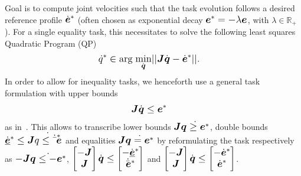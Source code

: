 Goal is to compute joint velocities such that the task evolution follows a desired reference profile
$\dot{\mbm{e}}^*$ (often chosen as exponential decay $\mbm{e}^*= -\lambda \mbm{e}$, with $\lambda
\in \mathbb{R}_+$). For a single equality task, this necessitates to solve the following least
squares Quadratic Program (QP)
%
\begin{align}\label{eq:QP}
  \dot{q}^* &\in \mbox{arg} \; \underset{\footnotesize\dot{\mbm{q}}\normalsize}{\mbox{min}}||\mbm{J}\dot{\mbm{q}}-\dot{\mbm{e}}^*||.
\end{align}
%
In order to allow for inequality tasks, we henceforth use a general task formulation with upper
bounds 
\begin{align}\label{eq:task}
 \mbm{J}\dot{\mbm{q}}&\leq \mbm{e}^*
\end{align}
%
as in~\cite{Esca14}. This allows to transcribe lower bounds $\mbm{J}\dot{\mbm{q} \geq \mbm{e}^*}$,
double bounds $\dot{\underline{\mbm{e}}}^* \leq \mbm{J}\dot{\mbm{q} \leq \dot{\bar{\mbm{e}}}^*}$ and
equalities $\mbm{J}\dot{\mbm{q}=\mbm{e}^*}$ by reformulating the task respectively as
$-\mbm{J}\dot{\mbm{q} \leq -\mbm{e}^*}$, $\begin{bmatrix} -\mbm{J} \\
  \mbm{J} \end{bmatrix}\dot{\mbm{q}} \leq \begin{bmatrix} -\dot{\underline{\mbm{e}}}^*
  \\ \dot{\bar{\mbm{e}}}^* \end{bmatrix}$ and $\begin{bmatrix} -\mbm{J} \\
  \mbm{J} \end{bmatrix}\dot{\mbm{q}} \leq \begin{bmatrix} -\dot{\mbm{e}}^* \\
  \dot{\mbm{e}}^* \end{bmatrix}$.

